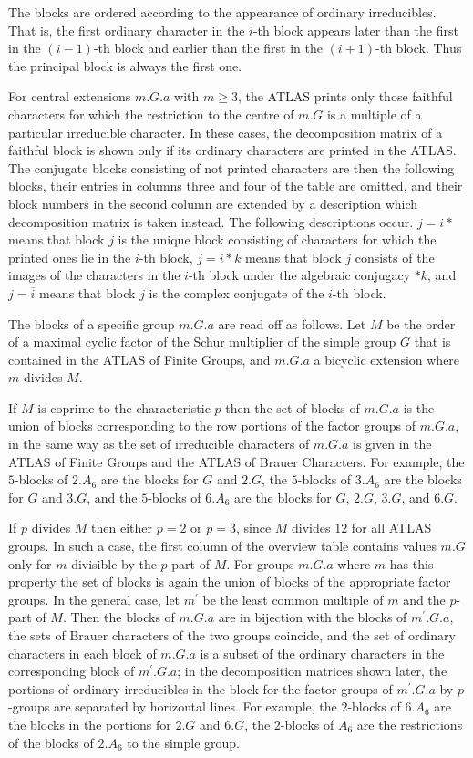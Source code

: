 \documentclass[a4paper]{article}
\def\ATLAS{\textsc{ATLAS}}
\begin{document}
The blocks are ordered according to the appearance of ordinary
irreducibles.
That is, the first ordinary character in the $i$-th block appears later
than the first in the $(i-1)$-th block and earlier than the first in the
$(i+1)$-th block.
Thus the principal block is always the first one.

For central extensions $m.G.a$ with $m \geq 3$,
the {\ATLAS} prints only those faithful characters for which
the restriction to the centre of $m.G$ is a multiple of a particular
irreducible character.
In these cases, the decomposition matrix of a faithful block is shown
only if its ordinary characters are printed in the {\ATLAS}.
The conjugate blocks consisting of not printed characters are then the
following blocks, their entries in columns three and four of the table
are omitted, and their block numbers in the second column are extended
by a description which decomposition matrix is taken instead.
The following descriptions occur.
$j = i\ast$ means that block $j$ is the unique block consisting of
characters for which the printed ones lie in the $i$-th block,
$j = i\ast k$ means that block $j$ consists of the images of the
characters in the $i$-th block under the algebraic conjugacy $\ast k$,
and $j = \overline{i}$ means that block $j$ is the complex conjugate of
the $i$-th block.

The blocks of a specific group $m.G.a$ are read off as follows.
Let $M$ be the order of a maximal cyclic factor of the Schur multiplier
of the simple group $G$ that is contained in the {\ATLAS} of Finite
Groups,
and $m.G.a$ a bicyclic extension where $m$ divides $M$.

If $M$ is coprime to the characteristic $p$ then the set of blocks of
$m.G.a$ is the union of blocks corresponding to the row portions
of the factor groups of $m.G.a$,
in the same way as the set of irreducible characters of $m.G.a$ is given
in the {\ATLAS} of Finite Groups and the {\ATLAS} of Brauer Characters.
For example, the $5$-blocks of $2.A_6$ are the blocks for $G$ and $2.G$,
the $5$-blocks of $3.A_6$ are the blocks for $G$ and $3.G$,
and the $5$-blocks of $6.A_6$ are the blocks for $G$, $2.G$, $3.G$, and
$6.G$.

If $p$ divides $M$ then either $p = 2$ or $p = 3$,
since $M$ divides $12$ for all {\ATLAS} groups.
In such a case, the first column of the overview table contains values
$m.G$ only for $m$ divisible by the $p$-part of $M$.
For groups $m.G.a$ where $m$ has this property the set of blocks is again
the union of blocks of the appropriate factor groups.
In the general case, let $m^{\prime}$ be the least common multiple of $m$
and the $p$-part of $M$.
Then the blocks of $m.G.a$ are in bijection with the blocks of
$m^{\prime}.G.a$, the sets of Brauer characters of the two groups
coincide,
and the set of ordinary characters in each block of $m.G.a$ is a subset
of the ordinary characters in the corresponding block of
$m^{\prime}.G.a$;
in the decomposition matrices shown later, the portions of ordinary
irreducibles in the block for the factor groups of $m^{\prime}.G.a$ by
$p$-groups are separated by horizontal lines.
For example, the $2$-blocks of $6.A_6$ are the blocks in the portions
for $2.G$ and $6.G$, the $2$-blocks of $A_6$ are the restrictions of the
blocks of $2.A_6$ to the simple group.
\end{document}
